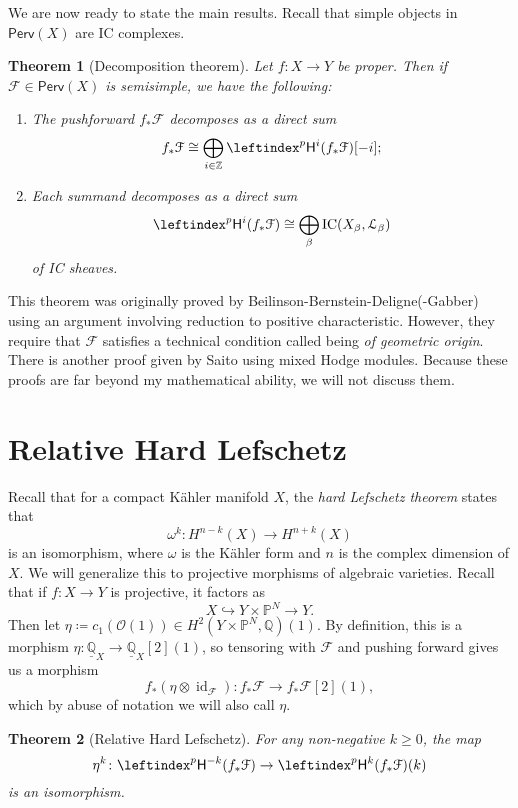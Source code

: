 \documentclass{amsart}
\newtheorem{thm}{Theorem}[section]
\theoremstyle{definition}
\theoremstyle{remark}
\theoremstyle{plain}
\theoremstyle{definition}
\theoremstyle{remark}
\newcommand{\Z}{\mathbb{Z}}
\newcommand{\Q}{\mathbb{Q}}
\renewcommand{\P}{\mathbb{P}}
\newcommand{\sH}{\mathsf{H}}
\newcommand{\mc}[1]{\mathcal{#1}}
\newcommand{\on}[1]{\operatorname{#1}}
\newcommand{\ms}[1]{\mathsf{#1}}
\newcommand{\ul}[1]{\underline{#1}}
\newcommand{\1}{\mathbf{1}}
\newcommand{\2}{\mathbf{2}}
\newcommand{\3}{\mathbf{3}}
\DeclareMathOperator{\IC}{IC}
\begin{document}
We are now ready to state the main results. Recall that simple objects in $\ms{Perv}(X)$ are IC complexes.

\begin{thm}[Decomposition theorem]
    Let $f \colon X \to Y$ be proper. Then if $\mc{F} \in \ms{Perv}(X)$ is semisimple, we have the following:
    \begin{enumerate}
        \item The pushforward $f_* \mc{F}$ decomposes as a direct sum
            \[ f_* \mc{F} \cong \bigoplus_{i \in \Z} \leftindex^p \sH^i(f_* \mc{F})[-i]; \]
        \item Each summand decomposes as a direct sum
            \[ \leftindex^p \sH^i(f_* \mc{F}) \cong \bigoplus_{\beta} \IC(X_{\beta}, \mc{L}_{\beta}) \]
            of IC sheaves.
    \end{enumerate}
\end{thm}

This theorem was originally proved by Beilinson-Bernstein-Deligne(-Gabber) using an argument involving reduction to positive characteristic. However, they require that $\mc{F}$ satisfies a technical condition called being \textit{of geometric origin}. There is another proof given by Saito using mixed Hodge modules. Because these proofs are far beyond my mathematical ability, we will not discuss them.

\section{Relative Hard Lefschetz}%
\label{sec:Relative Hard Lefschetz}

Recall that for a compact K\"ahler manifold $X$, the \textit{hard Lefschetz theorem} states that
\[ \omega^k \colon H^{n-k}(X) \to H^{n+k}(X) \]
is an isomorphism, where $\omega$ is the K\"ahler form and $n$ is the complex dimension of $X$. We will generalize this to projective morphisms of algebraic varieties.
Recall that if $f \colon X \to Y$ is projective, it factors as
\[ X \hookrightarrow Y \times \P^N \to Y. \]
Then let $\eta \coloneqq c_1(\mc{O}(1)) \in H^2(Y \times \P^N, \Q)(1)$. By definition, this is a morphism $\eta \colon \ul{\Q}_X \to \ul{\Q}_X[2](1)$, so tensoring with $\mc{F}$ and pushing forward gives us a morphism
\[ f_* (\eta \otimes \on{id}_{\mc{F}}) \colon f_* \mc{F} \to f_* \mc{F}[2](1), \]
which by abuse of notation we will also call $\eta$.

\begin{thm}[Relative Hard Lefschetz]
    For any non-negative $k \geq 0$, the map
    \[ \eta^k \colon \leftindex^p \sH^{-k}(f_* \mc{F}) \to \leftindex^p \sH^k (f_* \mc{F})(k) \]
    is an isomorphism.
\end{thm}
\end{document}

